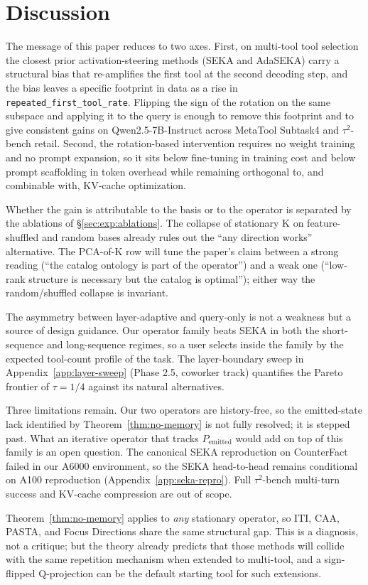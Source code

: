 \section{Discussion}\label{sec:discussion}

The message of this paper reduces to two axes. First, on multi-tool tool selection the closest prior activation-steering methods (SEKA and AdaSEKA) carry a structural bias that re-amplifies the first tool at the second decoding step, and the bias leaves a specific footprint in data as a rise in \texttt{repeated\_first\_tool\_rate}. Flipping the sign of the rotation on the same subspace and applying it to the query is enough to remove this footprint and to give consistent gains on Qwen2.5-7B-Instruct across MetaTool Subtask4 and $\tau^2$-bench retail. Second, the rotation-based intervention requires no weight training and no prompt expansion, so it sits below fine-tuning in training cost and below prompt scaffolding in token overhead while remaining orthogonal to, and combinable with, KV-cache optimization.

Whether the gain is attributable to the basis or to the operator is separated by the ablations of \S\ref{sec:exp:ablations}. The collapse of stationary K on feature-shuffled and random bases already rules out the ``any direction works'' alternative. The PCA-of-K row will tune the paper's claim between a strong reading (``the catalog ontology is part of the operator'') and a weak one (``low-rank structure is necessary but the catalog is optimal''); either way the random/shuffled collapse is invariant.

The asymmetry between layer-adaptive and query-only is not a weakness but a source of design guidance. Our operator family beats SEKA in both the short-sequence and long-sequence regimes, so a user selects inside the family by the expected tool-count profile of the task. The layer-boundary sweep in Appendix~\ref{app:layer-sweep} (Phase 2.5, coworker track) quantifies the Pareto frontier of $\tau = 1/4$ against its natural alternatives.

Three limitations remain. Our two operators are history-free, so the emitted-state lack identified by Theorem~\ref{thm:no-memory} is not fully resolved; it is stepped past. What an iterative operator that tracks $P_{\mathrm{emitted}}$ would add on top of this family is an open question. The canonical SEKA reproduction on CounterFact failed in our A6000 environment, so the SEKA head-to-head remains conditional on A100 reproduction (Appendix~\ref{app:seka-repro}). Full $\tau^2$-bench multi-turn success and KV-cache compression are out of scope.

Theorem~\ref{thm:no-memory} applies to \emph{any} stationary operator, so ITI, CAA, PASTA, and Focus Directions share the same structural gap. This is a diagnosis, not a critique; but the theory already predicts that those methods will collide with the same repetition mechanism when extended to multi-tool, and a sign-flipped Q-projection can be the default starting tool for such extensions.
